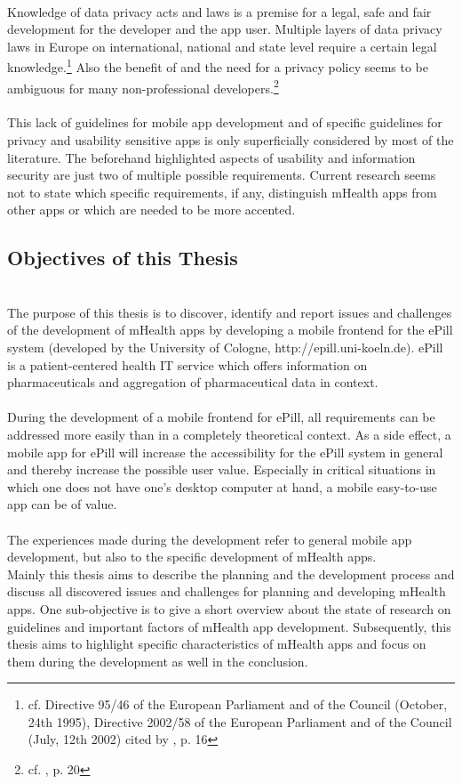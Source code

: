 \\
Knowledge of data privacy acts and laws is a premise for a legal, safe and fair development for the developer and the app user. Multiple layers of data privacy laws in Europe on international, national and state level require a certain legal knowledge.\footnote{cf. Directive 95/46 of the European Parliament and of the Council (October, 24th 1995), Directive 2002/58 of the European Parliament and of the Council (July, 12th 2002) cited by \cite{FutureofPrivacyForumCenterforDemocracy&Technology.2011}, p. 16} Also the benefit of and the need for a privacy policy seems to be ambiguous for many non-professional developers.\footnote{cf. \cite{Njie.2013}, p. 20}
\\
\\
This lack of guidelines for mobile app development and of specific guidelines for privacy and usability sensitive apps is only superficially considered by most of the literature. The beforehand highlighted aspects of usability and information security are just two of multiple possible requirements. Current research seems not to state which specific requirements, if any, distinguish mHealth apps from other apps or which are needed to be more accented.

\subsection{Objectives of this Thesis}
\\
The purpose of this thesis is to discover, identify and report issues and challenges of the development of mHealth apps by developing a mobile frontend for the ePill system (developed by the University of Cologne, http://epill.uni-koeln.de). ePill is a patient-centered health IT service which offers information on pharmaceuticals and aggregation of pharmaceutical data in context.
\\
\\
During the development of a mobile frontend for ePill, all requirements can be addressed more easily than in a completely theoretical context. As a side effect, a mobile app for ePill will increase the accessibility for the ePill system in general and thereby increase the possible user value. Especially in critical situations in which one does not have one's desktop computer at hand, a mobile easy-to-use app can be of value.
\\
\\
The experiences made during the development refer to general mobile app development, but also to the specific development of mHealth apps.
\\
Mainly this thesis aims to describe the planning and the development process and discuss all discovered issues and challenges for planning and developing mHealth apps. One sub-objective is to give a short overview about the state of research on guidelines and important factors of mHealth app development. Subsequently, this thesis aims to highlight specific characteristics of mHealth apps and focus on them during the development as well in the conclusion. 